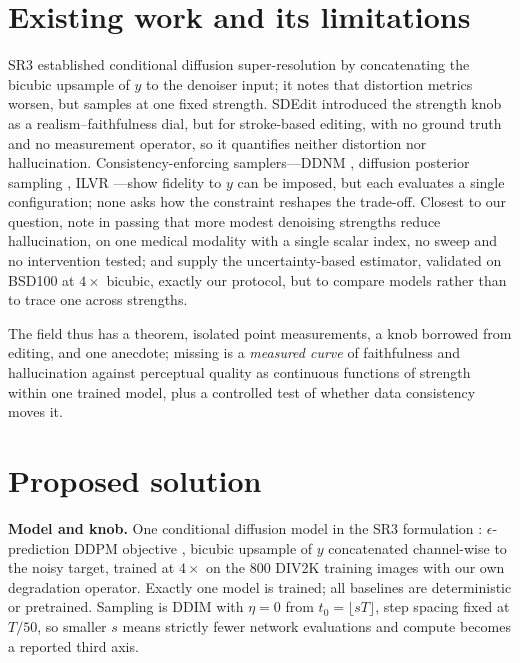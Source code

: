 \documentclass{article}
\begin{document}
\section{Existing work and its limitations}

SR3 \citep{saharia2023sr3} established conditional diffusion super-resolution
by concatenating the bicubic upsample of $y$ to the denoiser input; it notes
that distortion metrics worsen, but samples at one fixed strength. SDEdit
\citep{meng2022sdedit} introduced the strength knob as a realism--faithfulness
dial, but for stroke-based editing, with no ground truth and no measurement
operator, so it quantifies neither distortion nor hallucination.
Consistency-enforcing samplers---DDNM \citep{wang2023ddnm}, diffusion posterior
sampling \citep{chung2023dps}, ILVR \citep{choi2021ilvr}---show fidelity to
$y$ can be imposed, but each evaluates a single configuration; none asks how the
constraint reshapes the trade-off. Closest to our question,
\citet{tivnan2024hallucination} note in passing that more modest denoising
strengths reduce hallucination, on one medical modality with a single scalar
index, no sweep and no intervention tested; and \citet{cohen2024looks} supply
the uncertainty-based estimator, validated on BSD100 at $4\times$ bicubic,
exactly our protocol, but to compare models rather than to trace one across
strengths.

The field thus has a theorem, isolated point measurements, a knob borrowed from
editing, and one anecdote; missing is a \emph{measured curve} of faithfulness
and hallucination against perceptual quality as continuous functions of strength
within one trained model, plus a controlled test of whether data consistency
moves it.

\section{Proposed solution}

\textbf{Model and knob.} One conditional diffusion model in the SR3 formulation
\citep{saharia2023sr3}: $\epsilon$-prediction DDPM objective
\citep{ho2020ddpm}, bicubic upsample of $y$ concatenated channel-wise to the
noisy target, trained at $4\times$ on the 800 DIV2K training images
\citep{agustsson2017div2k} with our own degradation operator. Exactly one model
is trained; all baselines are deterministic or pretrained.
Sampling is DDIM \citep{song2021ddim} with $\eta=0$ from $t_0 = \lfloor sT
\rfloor$, step spacing fixed at $T/50$, so smaller $s$ means strictly fewer
network evaluations and compute becomes a reported third axis.
\end{document}
